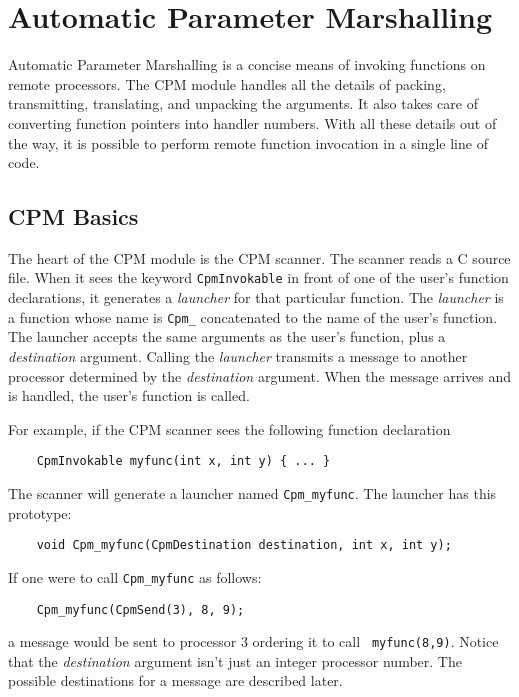 \chapter{Automatic Parameter Marshalling}

Automatic Parameter Marshalling is a concise means of invoking
functions on remote processors.  The CPM module handles all the
details of packing, transmitting, translating, and unpacking the
arguments.  It also takes care of converting function pointers into
handler numbers.  With all these details out of the way, it is
possible to perform remote function invocation in a single line of
code.

\section{CPM Basics}

The heart of the CPM module is the CPM scanner.  The scanner reads a C
source file.  When it sees the keyword {\tt CpmInvokable} in front of
one of the user's function declarations, it generates a {\it launcher}
for that particular function.  The {\it launcher} is a function whose
name is {\tt Cpm\_} concatenated to the name of the user's function.
The launcher accepts the same arguments as the user's function, plus a
{\it destination} argument.  Calling the {\it launcher} transmits a
message to another processor determined by the {\it destination}
argument.  When the message arrives and is handled, the user's
function is called.

For example, if the CPM scanner sees the following function
declaration

\begin{verbatim}
    CpmInvokable myfunc(int x, int y) { ... }
\end{verbatim}

The scanner will generate a launcher named {\tt Cpm\_myfunc}.
The launcher has this prototype:

\begin{verbatim}
    void Cpm_myfunc(CpmDestination destination, int x, int y);
\end{verbatim}

If one were to call {\tt Cpm\_myfunc} as follows:

\begin{verbatim}
    Cpm_myfunc(CpmSend(3), 8, 9);
\end{verbatim}

a message would be sent to processor 3 ordering it to call {\tt
myfunc(8,9)}.  Notice that the {\it destination} argument isn't just an
integer processor number.  The possible destinations for a message are
described later.

